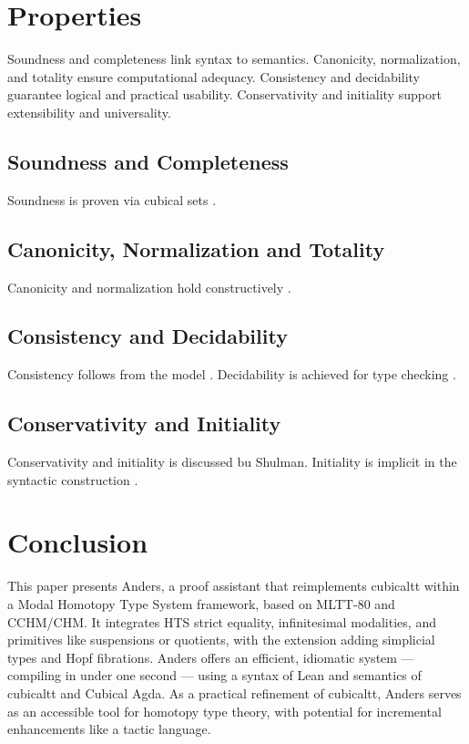 \documentclass[a4paper,UKenglish,cleveref, autoref, thm-restate]{lipics-v2021}
\begin{document}
\newpage
\section{Properties}

Soundness and completeness link syntax to semantics.
Canonicity, normalization, and totality ensure computational adequacy.
Consistency and decidability guarantee logical and practical usability.
Conservativity and initiality support extensibility and universality.

\subsection{Soundness and Completeness}

Soundness is proven via cubical sets \cite{CCHM, Awodey12, Coquand18}.

\subsection{Canonicity, Normalization and Totality}

Canonicity and normalization hold constructively \cite{Huber17, Streicher91}.

\subsection{Consistency and Decidability}

Consistency follows from the model \cite{Bezem14}.
Decidability is achieved for type checking \cite{Coquand18}.

\subsection{Conservativity and Initiality}

Conservativity and initiality is discussed bu Shulman\cite{Hofmann97, Shulman15}.
Initiality is implicit in the syntactic construction \cite{Awodey12}.

\section{Conclusion}

This paper presents Anders, a proof assistant that reimplements
cubicaltt within a Modal Homotopy Type System framework, based
on MLTT-80 and CCHM/CHM. It integrates HTS strict equality,
infinitesimal modalities, and primitives like suspensions or quotients,
with the extension adding simplicial types and Hopf fibrations.
Anders offers an efficient, idiomatic system — compiling in under
one second — using a syntax of Lean and semantics of cubicaltt and Cubical Agda.
As a practical refinement of cubicaltt, Anders serves as an accessible
tool for homotopy type theory, with potential for incremental
enhancements like a tactic language.
\end{document}
